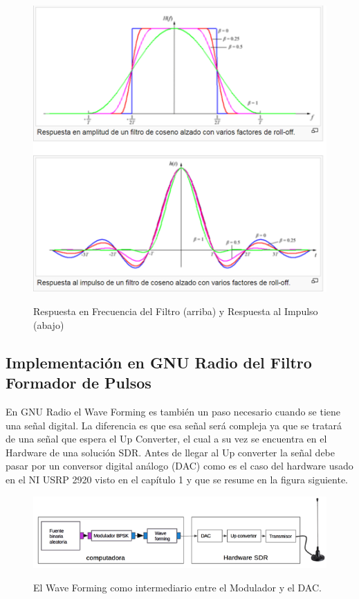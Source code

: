 \vspace{300px}
\begin{figure}[h!]
	\captionsetup{justification = raggedright, singlelinecheck = false}
	\caption{Respuesta en Frecuencia del Filtro (arriba) y Respuesta al Impulso (abajo)} 
	\centering
	\includegraphics[scale=0.8]{Imagenes/Roll-off.png}
	\label{fig:Roll-off}
\end{figure}

\subsection{Implementación en GNU Radio del Filtro Formador de Pulsos}

En GNU Radio el Wave Forming es también un paso necesario cuando se tiene una señal digital. La diferencia es que esa señal será compleja ya que se tratará de una señal que espera el Up Converter, el cual a su vez se encuentra en el Hardware de una solución SDR. Antes de llegar al Up converter la señal debe pasar por un conversor digital análogo (DAC) como es el caso del hardware usado en el NI USRP 2920 visto en el capítulo  1 y que se resume en la figura siguiente.\\

\begin{figure}[h!]
	\captionsetup{justification = raggedright, singlelinecheck = false}
	\caption{ El Wave Forming como intermediario entre el Modulador y el DAC.} 
	\centering
	\includegraphics[scale=1]{Imagenes/Wave.png}
	\label{fig:Wave}
\end{figure}

